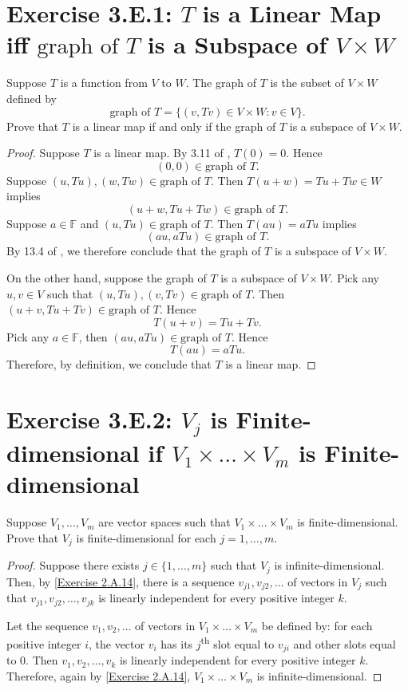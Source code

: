 \section{Exercise 3.E.1: $T$ is a Linear Map iff $\text{graph of }T$ is a Subspace of $V\times W$}
Suppose $T$ is a function from $V$ to $W$. The graph of $T$ is the subset of $V\times W$ defined by\[
\text{graph of }T=\{(v,Tv)\in V\times W:v\in V\}.
\]Prove that $T$ is a linear map if and only if the graph of $T$ is a subspace of $V\times W$.
\begin{proof}
Suppose $T$ is a linear map. By 3.11 of \cite{axler2014linear}, $T(0)=0$. Hence\[
(0,0)\in\text{graph of }T.
\]Suppose $(u, Tu), (w,Tw)\in\text{graph of }T$. Then $T(u+w)=Tu+Tw\in W$ implies\[
(u+w,Tu+Tw)\in\text{graph of }T.
\]Suppose $a\in\mathbb{F}$ and $(u, Tu)\in\text{graph of }T$. Then $T(au)=aTu$ implies\[
(au,aTu)\in\text{graph of }T.
\]By 13.4 of \cite{axler2014linear}, we therefore conclude that the graph of $T$ is a subspace of $V\times W$.

On the other hand, suppose the graph of $T$ is a subspace of $V\times W$. Pick any $u,v\in V$ such that $(u,Tu), (v, Tv)\in\text{graph of }T$. Then $(u+v,Tu+Tv)\in\text{graph of }T$. Hence\[
T(u+v)=Tu+Tv.
\]Pick any $a\in\mathbb{F}$, then $(au,aTu)\in\text{graph of }T$. Hence\[
T(au)=aTu.
\]Therefore, by definition, we conclude that $T$ is a linear map.
\end{proof}
\section{Exercise 3.E.2: $V_j$ is Finite-dimensional if $V_1\times\dots\times V_m$ is Finite-dimensional}
Suppose $V_1,\dots,V_m$ are vector spaces such that $V_1\times\dots\times V_m$ is finite-dimensional. Prove that $V_j$ is finite-dimensional for each $j=1,\dots,m$.
\begin{proof}
Suppose there exists $j\in\{1,\dots,m\}$ such that $V_j$ is infinite-dimensional. Then, by \ref{Exercise 2.A.14}, there is a sequence $v_{j1},v_{j2},\dots$ of vectors in $V_j$ such that $v_{j1},v_{j2},\dots,v_{jk}$ is linearly independent for every positive integer $k$.

Let the sequence $v_1,v_2,\dots$ of vectors in $V_1\times\dots\times V_m$ be defined by: for each positive integer $i$, the vector $v_i$ has its $j$\textsuperscript{th} slot equal to $v_{ji}$ and other slots equal to $0$. Then $v_{1},v_{2},\dots,v_{k}$ is linearly independent for every positive integer $k$. Therefore, again by \ref{Exercise 2.A.14}, $V_1\times\dots\times V_m$ is infinite-dimensional.
\end{proof}
